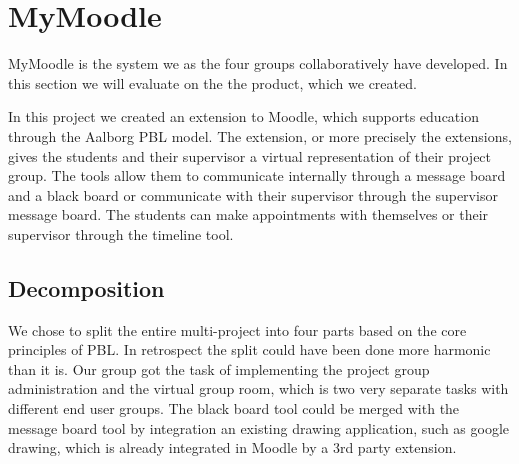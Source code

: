 \section{MyMoodle}
MyMoodle is the system we as the four groups collaboratively have developed.
In this section we will evaluate on the the product, which we created.


In this project we created an extension to Moodle, which supports education through the Aalborg PBL model. 
The extension, or more precisely the extensions, gives the students and their supervisor a virtual representation of their project group. 
The tools allow them to communicate internally through a message board and a black board or communicate with their supervisor through the supervisor message board.
The students can make appointments with themselves or  their supervisor through the timeline tool.


\subsection{Decomposition}
We chose to split the entire multi-project into four parts based on the core principles of PBL. 
In retrospect the split could have been done more harmonic than it is.
Our group got the task of implementing the project group administration and the virtual group room, which is two very separate tasks with different end user groups. 
The black board tool could be merged with the message board tool by integration an existing drawing application, such as google drawing, which is already integrated in Moodle by a 3rd party extension. 

